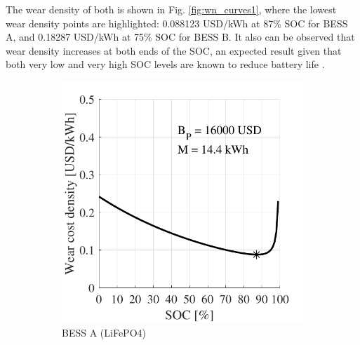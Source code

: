 \documentclass{ieeeaccess}
\begin{document}
    The wear density of both is shown in Fig. \ref{fig:wn_curves1}, where the lowest wear density points are highlighted: 0.088123 USD/kWh at 87\% \ac{SOC} for \ac{BESS} A, and 0.18287 USD/kWh at 75\% \ac{SOC} for \ac{BESS} B. It also can be observed that wear density increases at both ends of the \ac{SOC}, an expected result given that both very low and very high \ac{SOC} levels are known to reduce battery life \cite{ECKER2014, WIKNER2018}.
    \begin{figure}[!h]
        \begin{subfigure}{.235\textwidth}
            \centering
            \includegraphics[width=\linewidth]{figures/marginal_NeoVolta_NV24_LiFePO4.pdf}
            \caption{\ac{BESS} A (LiFePO4)}
            \label{fig:wn_curves1A}
        \end{subfigure}
        \begin{subfigure}{.235\textwidth}
            \centering

\end{subfigure}
\end{figure}
\end{document}
